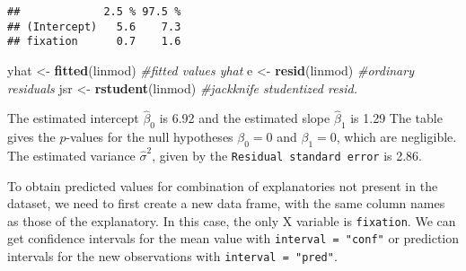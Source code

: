 \documentclass[
]{book}
\newenvironment{Shaded}{\begin{snugshade}}{\end{snugshade}}
\newcommand{\CommentTok}[1]{\textcolor[rgb]{0.56,0.35,0.01}{\textit{#1}}}
\newcommand{\KeywordTok}[1]{\textcolor[rgb]{0.13,0.29,0.53}{\textbf{#1}}}
\newcommand{\NormalTok}[1]{#1}
\newcommand{\StringTok}[1]{\textcolor[rgb]{0.31,0.60,0.02}{#1}}
\begin{document}
\begin{verbatim}
##             2.5 % 97.5 %
## (Intercept)   5.6    7.3
## fixation      0.7    1.6
\end{verbatim}

\begin{Shaded}
\begin{Highlighting}[]
\NormalTok{yhat <-}\StringTok{ }\KeywordTok{fitted}\NormalTok{(linmod) }\CommentTok{#fitted values yhat}
\NormalTok{e <-}\StringTok{ }\KeywordTok{resid}\NormalTok{(linmod) }\CommentTok{#ordinary residuals}
\NormalTok{jsr <-}\StringTok{ }\KeywordTok{rstudent}\NormalTok{(linmod) }\CommentTok{#jackknife studentized resid.}
\end{Highlighting}
\end{Shaded}

The estimated intercept \(\widehat{\beta}_0\) is 6.92 and the estimated slope \(\widehat{\beta}_1\) is 1.29 The table gives the \(p\)-values for the null hypotheses \(\beta_0=0\) and \(\beta_1=0\), which are negligible. The estimated variance \(\widehat{\sigma}^2\), given by the \texttt{Residual\ standard\ error} is 2.86.

To obtain predicted values for combination of explanatories not present in the dataset, we need to first create a new data frame, with the same column names as those of the explanatory. In this case, the only \(\mathrm{X}\) variable is \texttt{fixation}. We can get confidence intervals for the mean value with \texttt{interval\ =\ "conf"} or prediction intervals for the new observations with \texttt{interval\ =\ "pred"}.
\end{document}
